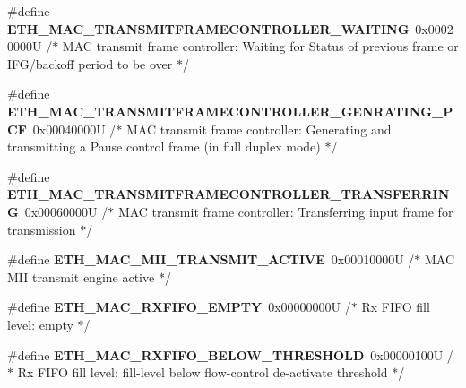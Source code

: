 \begin{DoxyCompactItemize}
\#define {\bfseries E\+T\+H\+\_\+\+M\+A\+C\+\_\+\+T\+R\+A\+N\+S\+M\+I\+T\+F\+R\+A\+M\+E\+C\+O\+N\+T\+R\+O\+L\+L\+E\+R\+\_\+\+W\+A\+I\+T\+I\+NG}~0x00020000\+U  /$\ast$ M\+A\+C transmit frame controller\+: Waiting for Status of previous frame or I\+F\+G/backoff period to be over $\ast$/
\item 
\mbox{\label{group___h_a_l___e_t_h___aliased___defines_ga30f5421c685cc87345a62034f03e9ede}} 
\#define {\bfseries E\+T\+H\+\_\+\+M\+A\+C\+\_\+\+T\+R\+A\+N\+S\+M\+I\+T\+F\+R\+A\+M\+E\+C\+O\+N\+T\+R\+O\+L\+L\+E\+R\+\_\+\+G\+E\+N\+R\+A\+T\+I\+N\+G\+\_\+\+P\+CF}~0x00040000\+U  /$\ast$ M\+A\+C transmit frame controller\+: Generating and transmitting a Pause control frame (in full duplex mode) $\ast$/
\item 
\mbox{\label{group___h_a_l___e_t_h___aliased___defines_ga813acc11409391a70e9c8f4e2c769cf1}} 
\#define {\bfseries E\+T\+H\+\_\+\+M\+A\+C\+\_\+\+T\+R\+A\+N\+S\+M\+I\+T\+F\+R\+A\+M\+E\+C\+O\+N\+T\+R\+O\+L\+L\+E\+R\+\_\+\+T\+R\+A\+N\+S\+F\+E\+R\+R\+I\+NG}~0x00060000\+U  /$\ast$ M\+A\+C transmit frame controller\+: Transferring input frame for transmission $\ast$/
\item 
\mbox{\label{group___h_a_l___e_t_h___aliased___defines_ga569a78f6147f1068ddeed3897776b6f3}} 
\#define {\bfseries E\+T\+H\+\_\+\+M\+A\+C\+\_\+\+M\+I\+I\+\_\+\+T\+R\+A\+N\+S\+M\+I\+T\+\_\+\+A\+C\+T\+I\+VE}~0x00010000\+U  /$\ast$ M\+A\+C M\+I\+I transmit engine active $\ast$/
\item 
\mbox{\label{group___h_a_l___e_t_h___aliased___defines_gab0663cbb0510f2d3bdc9fdaea103725e}} 
\#define {\bfseries E\+T\+H\+\_\+\+M\+A\+C\+\_\+\+R\+X\+F\+I\+F\+O\+\_\+\+E\+M\+P\+TY}~0x00000000\+U  /$\ast$ Rx F\+I\+F\+O fill level\+: empty $\ast$/
\item 
\mbox{\label{group___h_a_l___e_t_h___aliased___defines_ga1ac34f74c22709a45510fe557e6b1866}} 
\#define {\bfseries E\+T\+H\+\_\+\+M\+A\+C\+\_\+\+R\+X\+F\+I\+F\+O\+\_\+\+B\+E\+L\+O\+W\+\_\+\+T\+H\+R\+E\+S\+H\+O\+LD}~0x00000100\+U  /$\ast$ Rx F\+I\+F\+O fill level\+: fill-\/level below flow-\/control de-\/activate threshold $\ast$/
\item 

\end{DoxyCompactItemize}
